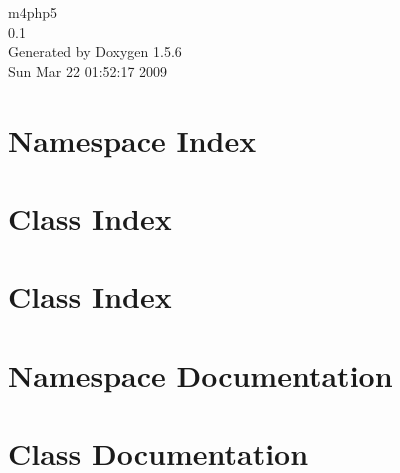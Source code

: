 \documentclass[a4paper]{book}
\begin{document}
\begin{titlepage}
\vspace*{7cm}
\begin{center}
{\Large m4php5 \\[1ex]\large 0.1 }\\
\vspace*{1cm}
{\large Generated by Doxygen 1.5.6}\\
\vspace*{0.5cm}
{\small Sun Mar 22 01:52:17 2009}\\
\end{center}
\end{titlepage}
\clearemptydoublepage
{}
\tableofcontents
\clearemptydoublepage
{}
\chapter{Namespace Index}

\chapter{Class Index}

\chapter{Class Index}

\chapter{Namespace Documentation}

\chapter{Class Documentation}



























\printindex
\end{document}

